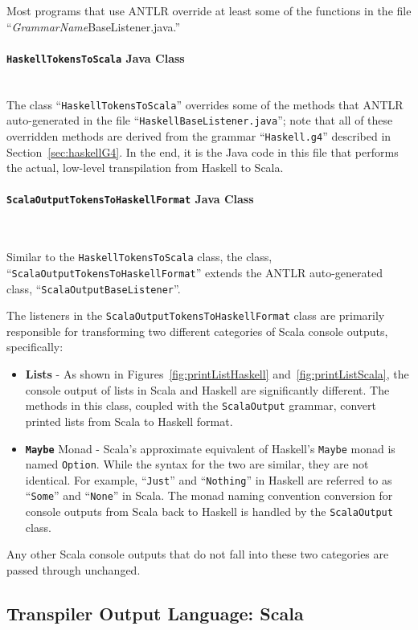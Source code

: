 \documentclass{report}
\newcommand{\myparagraph}[1]{\paragraph{#1}\mbox{}\\}
\begin{document}
Most programs that use ANTLR override at least some of the functions in the file ``\emph{GrammarName}BaseListener.java.''


\myparagraph{\texttt{HaskellTokensToScala} Java Class}

The class ``\texttt{HaskellTokensToScala}'' overrides some of the methods that ANTLR auto-generated in the file ``\texttt{HaskellBaseListener.java}''; note that all of these overridden methods are derived from the grammar ``\texttt{Haskell.g4}'' described in Section~\ref{sec:haskellG4}.  In the end, it is the Java code in this file that performs the actual, low-level transpilation from Haskell to Scala.

\eject
\myparagraph{\texttt{ScalaOutputTokensToHaskellFormat} Java Class}\label{sec:scalaOutputFunctionality}

Similar to the \texttt{HaskellTokensToScala} class, the class, ``\texttt{ScalaOutputTokensToHaskellFormat}'' extends the ANTLR auto-generated class, ``\texttt{ScalaOutputBaseListener}''.

The listeners in the \texttt{ScalaOutputTokensToHaskellFormat} class are primarily responsible for transforming two different categories of Scala console outputs, specifically:

\begin{itemize}

\item \textbf{Lists} - As shown in Figures~\ref{fig:printListHaskell} and~\ref{fig:printListScala}, the console output of lists in Scala and Haskell are significantly different.  The methods in this class, coupled with the \texttt{ScalaOutput} grammar, convert printed lists from Scala to Haskell format.

\item \textbf{\texttt{Maybe}} Monad - Scala's approximate equivalent of Haskell's \texttt{Maybe} monad is named \texttt{Option}.  While the syntax for the two are similar, they are not identical.  For example, ``\texttt{Just}'' and ``\texttt{Nothing}'' in Haskell are referred to as ``\texttt{Some}'' and ``\texttt{None}'' in Scala.  The monad naming convention conversion for console outputs from Scala back to Haskell is handled by the \texttt{ScalaOutput} class.

\end{itemize}

Any other Scala console outputs that do not fall into these two categories are passed through unchanged.


\subsection{Transpiler Output Language: Scala}
\end{document}
